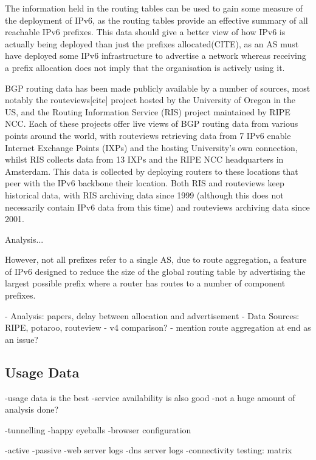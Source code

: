 The information held in the routing tables can be used to gain some measure of
the deployment of IPv6, as the routing tables provide an effective summary of
all reachable IPv6 prefixes. This data should give a better view of how IPv6 is
actually being deployed than just the prefixes allocated(CITE), as an AS must
have deployed some IPv6 infrastructure to advertise a network whereas receiving
a prefix allocation does not imply that the organisation is actively using it.

BGP routing data has been made publicly available by a number of sources, most
notably the routeviews[cite] project hosted by the University of Oregon in the
US, and the Routing Information Service (RIS) project maintained by RIPE NCC.
Each of these projects offer live views of BGP routing data from various points
around the world, with routeviews retrieving data from 7 IPv6 enable Internet
Exchange Points (IXPs) and the hosting University's own connection, whilst RIS
collects data from 13 IXPs and the RIPE NCC headquarters in Amsterdam. This data
is collected by deploying routers to these locations that peer with the IPv6
backbone their location. Both RIS and routeviews keep historical data, with RIS
archiving data since 1999 (although this does not necessarily contain IPv6 data
from this time) and routeviews archiving data since 2001. 

Analysis...



However, not all prefixes refer to a single AS,
due to route aggregation, a feature of IPv6 designed to reduce the size of the
global routing table by advertising the largest possible prefix where a router
has routes to a number of component prefixes.


- Analysis: papers, delay between allocation and advertisement
- Data Sources: RIPE, potaroo, routeview
- v4 comparison?
- mention route aggregation at end as an issue?

\subsection{Usage Data}

-usage data is the best
-service availability is also good
-not a huge amount of analysis done?

-tunnelling
-happy eyeballs
-browser configuration

-active
-passive
-web server logs
-dns server logs
-connectivity testing: matrix

